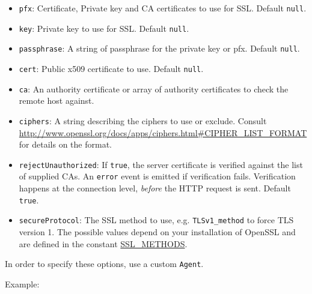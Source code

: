 \begin{itemize}
\itemsep1pt\parskip0pt
\item
  \texttt{pfx}: Certificate, Private key and CA certificates to use for
  SSL. Default \texttt{null}.
\item
  \texttt{key}: Private key to use for SSL. Default \texttt{null}.
\item
  \texttt{passphrase}: A string of passphrase for the private key or
  pfx. Default \texttt{null}.
\item
  \texttt{cert}: Public x509 certificate to use. Default \texttt{null}.
\item
  \texttt{ca}: An authority certificate or array of authority
  certificates to check the remote host against.
\item
  \texttt{ciphers}: A string describing the ciphers to use or exclude.
  Consult
  \url{http://www.openssl.org/docs/apps/ciphers.html\#CIPHER_LIST_FORMAT}
  for details on the format.
\item
  \texttt{rejectUnauthorized}: If \texttt{true}, the server certificate
  is verified against the list of supplied CAs. An
  \texttt{\textquotesingle{}error\textquotesingle{}} event is emitted if
  verification fails. Verification happens at the connection level,
  \emph{before} the HTTP request is sent. Default \texttt{true}.
\item
  \texttt{secureProtocol}: The SSL method to use, e.g.
  \texttt{TLSv1\_method} to force TLS version 1. The possible values
  depend on your installation of OpenSSL and are defined in the constant
  \href{http://www.openssl.org/docs/ssl/ssl.html\#DEALING_WITH_PROTOCOL_METHODS}{SSL\_METHODS}.
\end{itemize}

In order to specify these options, use a custom \texttt{Agent}.

Example:

\begin{Shaded}
\begin{Highlighting}[]
 
  \NormalTok{: }\NormalTok{,}
  \NormalTok{: }\NormalTok{,}
  \NormalTok{: }\NormalTok{,}
  \NormalTok{: }\NormalTok{,}
  \NormalTok{: }\NormalTok{(}\NormalTok{),}
  \NormalTok{: }\NormalTok{(}\NormalTok{)}
\NormalTok{\};}
 \NormalTok{= } 

 
\NormalTok{\}}
\end{Highlighting}
\end{Shaded}

